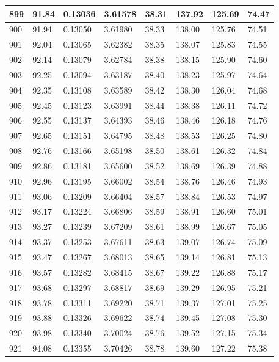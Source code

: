 \documentclass[12pt,a4paper,twoside]{article}
\begin{document}
\begin{center}
\begin{longtable}{l l l l | l l l l}
899 & 91.84 & 0.13036 & 3.61578 & 38.31 & 137.92 & 125.69 & 74.47 \\ \hline
900 & 91.94 & 0.13050 & 3.61980 & 38.33 & 138.00 & 125.76 & 74.51 \\ \hline
901 & 92.04 & 0.13065 & 3.62382 & 38.35 & 138.07 & 125.83 & 74.55 \\ \hline
902 & 92.14 & 0.13079 & 3.62784 & 38.38 & 138.15 & 125.90 & 74.60 \\ \hline
903 & 92.25 & 0.13094 & 3.63187 & 38.40 & 138.23 & 125.97 & 74.64 \\ \hline
904 & 92.35 & 0.13108 & 3.63589 & 38.42 & 138.30 & 126.04 & 74.68 \\ \hline
905 & 92.45 & 0.13123 & 3.63991 & 38.44 & 138.38 & 126.11 & 74.72 \\ \hline
906 & 92.55 & 0.13137 & 3.64393 & 38.46 & 138.46 & 126.18 & 74.76 \\ \hline
907 & 92.65 & 0.13151 & 3.64795 & 38.48 & 138.53 & 126.25 & 74.80 \\ \hline
908 & 92.76 & 0.13166 & 3.65198 & 38.50 & 138.61 & 126.32 & 74.84 \\ \hline
909 & 92.86 & 0.13181 & 3.65600 & 38.52 & 138.69 & 126.39 & 74.88 \\ \hline
910 & 92.96 & 0.13195 & 3.66002 & 38.54 & 138.76 & 126.46 & 74.93 \\ \hline
911 & 93.06 & 0.13209 & 3.66404 & 38.57 & 138.84 & 126.53 & 74.97 \\ \hline
912 & 93.17 & 0.13224 & 3.66806 & 38.59 & 138.91 & 126.60 & 75.01 \\ \hline
913 & 93.27 & 0.13239 & 3.67209 & 38.61 & 138.99 & 126.67 & 75.05 \\ \hline
914 & 93.37 & 0.13253 & 3.67611 & 38.63 & 139.07 & 126.74 & 75.09 \\ \hline
915 & 93.47 & 0.13267 & 3.68013 & 38.65 & 139.14 & 126.81 & 75.13 \\ \hline
916 & 93.57 & 0.13282 & 3.68415 & 38.67 & 139.22 & 126.88 & 75.17 \\ \hline
917 & 93.68 & 0.13297 & 3.68817 & 38.69 & 139.29 & 126.95 & 75.21 \\ \hline
918 & 93.78 & 0.13311 & 3.69220 & 38.71 & 139.37 & 127.01 & 75.25 \\ \hline
919 & 93.88 & 0.13326 & 3.69622 & 38.74 & 139.45 & 127.08 & 75.30 \\ \hline
920 & 93.98 & 0.13340 & 3.70024 & 38.76 & 139.52 & 127.15 & 75.34 \\ \hline
921 & 94.08 & 0.13355 & 3.70426 & 38.78 & 139.60 & 127.22 & 75.38 \\ \hline

\end{longtable}
\end{center}
\end{document}
